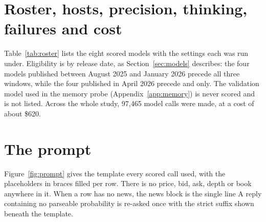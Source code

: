 \section{Roster, hosts, precision, thinking, failures and cost}
\label{app:roster}
Table~\ref{tab:roster} lists the eight scored models with the settings each was
run under. Eligibility is by release date, as Section~\ref{sec:models} describes:
the four models published between August 2025 and January 2026 precede all
three windows, while the four published in April 2026 precede \winC and \winB
only. The validation model used in the memory
probe (Appendix~\ref{app:memory}) is never scored and is not listed. Across the whole study, 97{,}465 model calls were made, at a cost of about \$620.

\begin{table}[!tbp]
\centering
\caption{The eight scored models. \emph{Windows} lists the windows each model is eligible for. \emph{Thinking} is either a reasoning-effort level (the OpenAI models and
\mGptOss) or a 1{,}000-token thinking budget; median thinking is tokens per reply, over every
recorded reply of the run. The reply limit is 4{,}000 tokens for every model, although
\mDeepSeekVFourPro's host truncated output at 3{,}000 on about 6\% of its calls. \emph{Failed
rows} gave no usable probability after one stricter re-ask; counts are for the scored pass,
and the memory-probe pass failed on a further 3 rows for \mKimiKTwoFive, 7 for
\mDeepSeekVFourPro and 1 for \mKimiKTwoSix. A dash marks a window a model was not eligible
for, or a precision its host does not state. Sources: ,
.}
\label{tab:roster}

\end{table}

\section{The prompt}
\label{app:prompt}
Figure~\ref{fig:prompt} gives the template every scored call used, with the
placeholders in braces filled per row. There is no price, bid, ask, depth or book
anywhere in it. When a row has no news, the news block is the single line
 A reply containing no parseable probability is
re-asked once with the strict suffix shown beneath the template.

